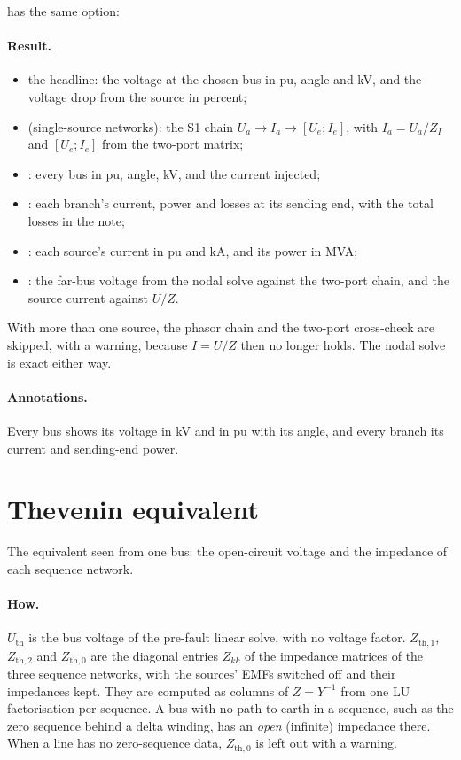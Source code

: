  has the same option:



\paragraph{Result.}
\begin{itemize}
  \item the headline: the voltage at the chosen bus in pu, angle and kV, and the voltage
    drop from the source in percent;
  \item {} (single-source networks): the S1 chain $U_a \to I_a \to [U_e;
    I_e]$, with $I_a = U_a/Z_I$ and $[U_e; I_e]$ from the two-port matrix;
  \item {}: every bus in pu, angle, kV, and the current injected;
  \item {}: each branch's current, power and losses at its sending end,
    with the total losses in the note;
  \item {}: each source's current in pu and kA, and its power in MVA;
  \item {}: the far-bus voltage from the nodal solve against the two-port
    chain, and the source current against $U/Z$.
\end{itemize}
With more than one source, the phasor chain and the two-port cross-check are skipped,
with a warning, because $I = U/Z$ then no longer holds. The nodal solve is exact either
way.

\paragraph{Annotations.} Every bus shows its voltage in kV and in pu with its angle, and
every branch its current and sending-end power.

\section{Thevenin equivalent}\label{sec:study-thevenin}

The equivalent seen from one bus: the open-circuit voltage and the impedance of each
sequence network.



\paragraph{How.} $U_\text{th}$ is the bus voltage of the pre-fault linear solve, with no
voltage factor. $Z_{\text{th},1}$, $Z_{\text{th},2}$ and $Z_{\text{th},0}$ are the diagonal
entries $Z_{kk}$ of the impedance matrices of the three sequence networks, with the
sources' EMFs switched off and their impedances kept. They are computed as columns of
$Z = Y^{-1}$ from one LU factorisation per sequence. A bus with no path to earth in a sequence,
such as the zero sequence behind a delta winding, has an \emph{open} (infinite) impedance
there. When a line has no zero-sequence data, $Z_{\text{th},0}$ is left out with a
warning.

